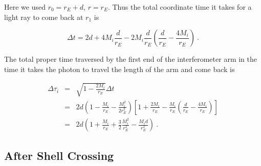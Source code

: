 \documentclass[aps,showpacs,twocolumn,floats,prd,superscriptaddress,nofootinbib]{revtex4-1}
\begin{document}
Here we used $r_0 = r_E+d$, $r = r_E$. Thus the total coordinate time it takes for a light ray to come back at $r_1$ is

\begin{equation}
\Delta t = 2d + 4M_i\frac{d}{r_E} - 2M_i\frac{d}{r_E}
\left( \frac{d}{r_E}-\frac{4M_i}{r_E} \right)~.
\end{equation}

The total proper time traversed by the first end of the interferometer arm in the time it takes the photon to travel the length of the arm and come back is 

\begin{eqnarray}
\Delta \tau_i &=& \sqrt{1-\frac{2M_i}{r_E}}\Delta t  \\ \nonumber
&=& 2d \left(1-\frac{M_i}{r_E} - \frac{M_i^2}{2r_E^2}\right) 
\left[ 1+\frac{2M_i}{r_E} - \frac{M_i}{r_E}\left( \frac{d}{r_E} - \frac{4M_i}{r_E} \right) \right] \\ \nonumber
&=& 2d
\left(1 + \frac{M_i}{r_E} + \frac{3}{2}\frac{M_i^2}{r_E^2} - \frac{M_id}{r_E^2}\right)~.
\end{eqnarray}

\subsection{After Shell Crossing}
\end{document}
